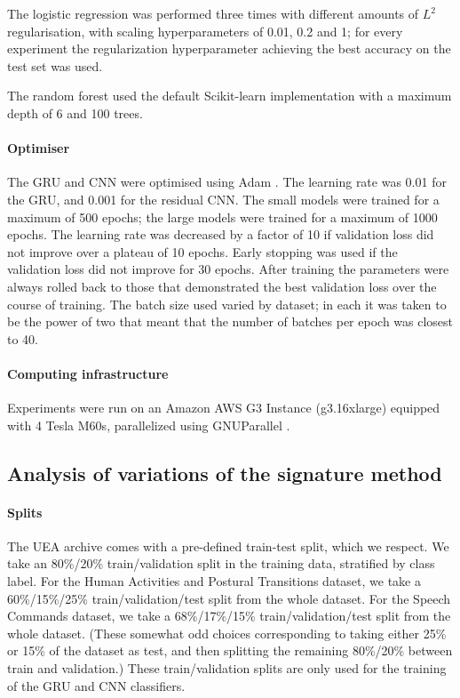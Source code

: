 \documentclass{article}
\theoremstyle{definition}
\theoremstyle{remark}
\begin{document}
	The logistic regression was performed three times with different amounts of $L^2$ regularisation, with scaling hyperparameters of 0.01, 0.2 and 1; for every experiment the regularization hyperparameter achieving the best accuracy on the test set was used.
	
	The random forest used the default Scikit-learn implementation with a maximum depth of 6 and 100 trees.
	
	\paragraph{Optimiser}The GRU and CNN were optimised using Adam \citep{adam}. The learning rate was 0.01 for the GRU, and 0.001 for the residual CNN. The small models were trained for a maximum of 500 epochs; the large models were trained for a maximum of 1000 epochs. The learning rate was decreased by a factor of 10 if validation loss did not improve over a plateau of 10 epochs. Early stopping was used if the validation loss did not improve for 30 epochs. After training the parameters were always rolled back to those that demonstrated the best validation loss over the course of training. The batch size used varied by dataset; in each it was taken to be the power of two that meant that the number of batches per epoch was closest to 40.
	
	\paragraph{Computing infrastructure}Experiments were run on an Amazon AWS G3 Instance (g3.16xlarge) equipped with 4 Tesla M60s, parallelized using GNUParallel \citep{Tange2011a}.

	\subsection{Analysis of variations of the signature method}\label{sec:omitted_experiments}\label{sec:experiment_details}
	\paragraph{Splits}
	The UEA archive comes with a pre-defined train-test split, which we respect. We take an 80\%/20\% train/validation split in the training data, stratified by class label. For the Human Activities and Postural Transitions dataset, we take a 60\%/15\%/25\% train/validation/test split from the whole dataset. For the Speech Commands dataset, we take a 68\%/17\%/15\% train/validation/test split from the whole dataset. (These somewhat odd choices corresponding to taking either 25\% or 15\% of the dataset as test, and then splitting the remaining 80\%/20\% between train and validation.) These train/validation splits are only used for the training of the GRU and CNN classifiers.
	
\end{document}
